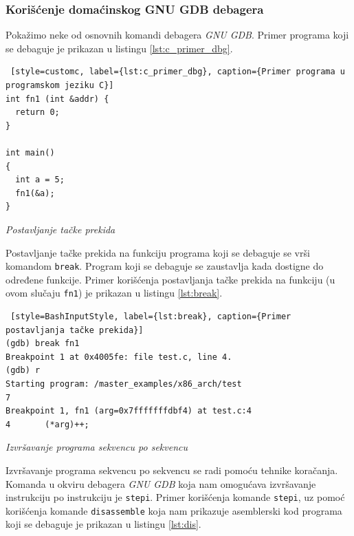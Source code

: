\documentclass[12pt,oneside]{memoir}
\begin{document}
\subsubsection{Korišćenje domaćinskog GNU GDB debagera}

Pokažimo neke od osnovnih komandi debagera \emph{GNU GDB}.
Primer programa koji se debaguje je prikazan u listingu \ref{lst:c_primer_dbg}.\newpage

\begin{lstlisting} [style=customc, label={lst:c_primer_dbg}, caption={Primer programa u programskom jeziku C}]
int fn1 (int &addr) {
  return 0;
}

int main()
{
  int a = 5;
  fn1(&a);
}
\end{lstlisting}

\begin{description}

\item{\emph{Postavljanje tačke prekida}}

Postavljanje tačke prekida na funkciju programa koji se debaguje se vrši komandom \texttt{break}. Program koji se debaguje se zaustavlja kada dostigne do određene funkcije. Primer korišćenja postavljanja tačke prekida na funkciju (u ovom slučaju \texttt{fn1}) je prikazan u listingu \ref{lst:break}.

\begin{lstlisting} [style=BashInputStyle, label={lst:break}, caption={Primer postavljanja tačke prekida}]
(gdb) break fn1
Breakpoint 1 at 0x4005fe: file test.c, line 4.
(gdb) r
Starting program: /master_examples/x86_arch/test 
7
Breakpoint 1, fn1 (arg=0x7fffffffdbf4) at test.c:4
4		(*arg)++;
\end{lstlisting}

\item{\emph{Izvršavanje programa sekvencu po sekvencu}}

Izvršavanje programa sekvencu po sekvencu se radi pomoću tehnike koračanja. Komanda u okviru debagera \emph{GNU GDB} koja nam omogućava izvršavanje instrukciju po instrukciju je \texttt{stepi}. Primer korišćenja komande \texttt{stepi}, uz pomoć korišćenja komande \texttt{disassemble} koja nam prikazuje asemblerski kod programa koji se debaguje je prikazan u listingu \ref{lst:dis}.\newpage


\end{description}
\end{document}
